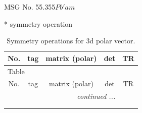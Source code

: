 \documentclass[fleqn,8pt]{jsarticle}
\begin{document}
\setcounter{MaxMatrixCols}{32}

\renewcommand{\tablename}{Table~}
\renewcommand{\figurename}{Figure~}
\begin{center}
\LARGE
MSG No. 55.355\quad$Pb'am$
\end{center}
* symmetry operation
\renewcommand{\arraystretch}{1.3}
\begin{longtable}{ccccc}
\caption{Symmetry operations for 3d polar vector.}
 \\
 \hline \hline
No. & tag & matrix (polar) & det & TR \\ \hline \endfirsthead

\multicolumn{4}{l}{\tablename\ \thetable{}} \\
 \hline \hline
No. & tag & matrix (polar) & det & TR \\ \hline \endhead

 \hline \hline
\multicolumn{4}{r}{\footnotesize\it continued ...} \\ \endfoot

 \hline \hline
\multicolumn{4}{r}{} \\ \endlastfoot


\end{longtable}
\end{document}
